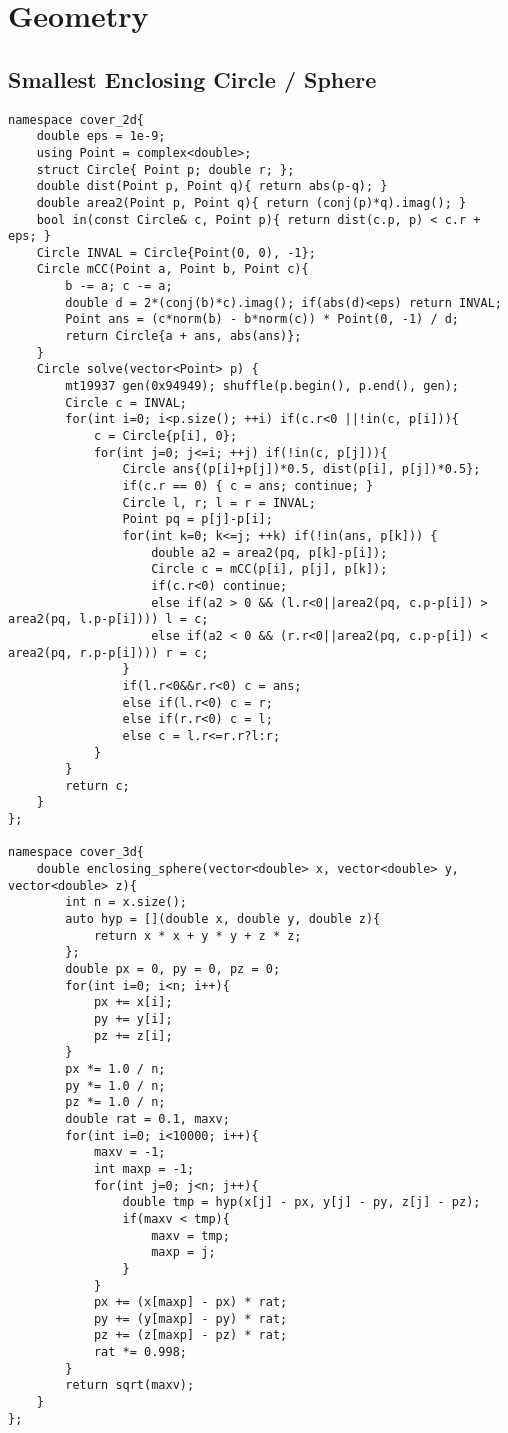 \documentclass[landscape, 8pt, a4paper, oneside, twocolumn]{extarticle}
\begin{document}
\section{Geometry}
\subsection{Smallest Enclosing Circle / Sphere}
\begin{verbatim}
namespace cover_2d{
	double eps = 1e-9;
	using Point = complex<double>;
	struct Circle{ Point p; double r; };
	double dist(Point p, Point q){ return abs(p-q); }
	double area2(Point p, Point q){ return (conj(p)*q).imag(); }
	bool in(const Circle& c, Point p){ return dist(c.p, p) < c.r + eps; }
	Circle INVAL = Circle{Point(0, 0), -1};
	Circle mCC(Point a, Point b, Point c){
		b -= a; c -= a;
		double d = 2*(conj(b)*c).imag(); if(abs(d)<eps) return INVAL;
		Point ans = (c*norm(b) - b*norm(c)) * Point(0, -1) / d;
		return Circle{a + ans, abs(ans)};
	}
	Circle solve(vector<Point> p) {
		mt19937 gen(0x94949); shuffle(p.begin(), p.end(), gen);
		Circle c = INVAL;
		for(int i=0; i<p.size(); ++i) if(c.r<0 ||!in(c, p[i])){
			c = Circle{p[i], 0};
			for(int j=0; j<=i; ++j) if(!in(c, p[j])){
				Circle ans{(p[i]+p[j])*0.5, dist(p[i], p[j])*0.5};
				if(c.r == 0) { c = ans; continue; }
				Circle l, r; l = r = INVAL;
				Point pq = p[j]-p[i];
				for(int k=0; k<=j; ++k) if(!in(ans, p[k])) {
					double a2 = area2(pq, p[k]-p[i]);
					Circle c = mCC(p[i], p[j], p[k]);
					if(c.r<0) continue;
					else if(a2 > 0 && (l.r<0||area2(pq, c.p-p[i]) > area2(pq, l.p-p[i]))) l = c;
					else if(a2 < 0 && (r.r<0||area2(pq, c.p-p[i]) < area2(pq, r.p-p[i]))) r = c;
				}
				if(l.r<0&&r.r<0) c = ans;
				else if(l.r<0) c = r;
				else if(r.r<0) c = l;
				else c = l.r<=r.r?l:r;
			}
		}
		return c;
	}
};

namespace cover_3d{
	double enclosing_sphere(vector<double> x, vector<double> y, vector<double> z){
		int n = x.size();
		auto hyp = [](double x, double y, double z){
			return x * x + y * y + z * z;
		};
		double px = 0, py = 0, pz = 0;
		for(int i=0; i<n; i++){
			px += x[i];
			py += y[i];
			pz += z[i];
		}
		px *= 1.0 / n;
		py *= 1.0 / n;
		pz *= 1.0 / n;
		double rat = 0.1, maxv;
		for(int i=0; i<10000; i++){
			maxv = -1;
			int maxp = -1;
			for(int j=0; j<n; j++){
				double tmp = hyp(x[j] - px, y[j] - py, z[j] - pz);
				if(maxv < tmp){
					maxv = tmp;
					maxp = j;
				}
			}
			px += (x[maxp] - px) * rat;
			py += (y[maxp] - py) * rat;
			pz += (z[maxp] - pz) * rat;
			rat *= 0.998;
		}
		return sqrt(maxv);
	}
};
\end{verbatim}
\end{document}

